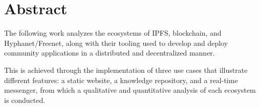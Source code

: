 \section{Abstract}

The following work analyzes the ecosystems of IPFS, blockchain, and Hyphanet/Freenet, along with their tooling used to develop and deploy community applications in a distributed and decentralized manner.

This is achieved through the implementation of three use cases that illustrate different features: a static website, a knowledge repository, and a real-time messenger, from which a qualitative and quantitative analysis of each ecosystem is conducted.